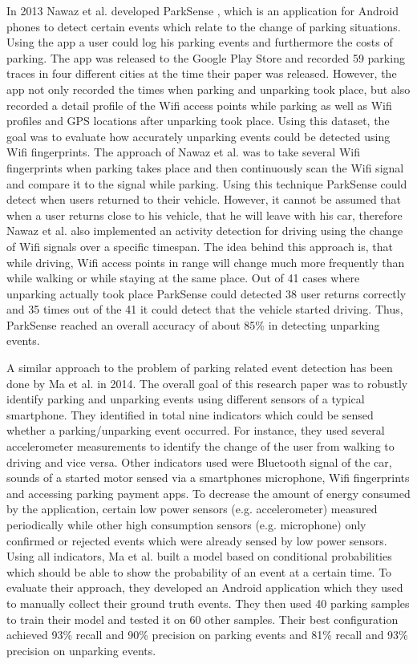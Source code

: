 In 2013 Nawaz et al. developed ParkSense \cite{Nawaz:2013:PSB:2500423.2500438}, which is an application for Android phones to detect certain events which relate to the change of parking situations. Using the app a user could log his parking events and furthermore the costs of parking. The app was released to the Google Play Store and recorded 59 parking traces in four different cities at the time their paper was released. However, the app not only recorded the times when parking and unparking took place, but also recorded a detail profile of the Wifi access points while parking as well as Wifi profiles and GPS locations after unparking took place. Using this dataset, the goal was to evaluate how accurately unparking events could be detected using Wifi fingerprints. The approach of Nawaz et al. was to take several Wifi fingerprints when parking takes place and then continuously scan the Wifi signal and compare it to the signal while parking. Using this technique ParkSense could detect when users returned to their vehicle. However, it cannot be assumed that when a user returns close to his vehicle, that he will leave with his car, therefore Nawaz et al. also implemented an activity detection for driving using the change of Wifi signals over a specific timespan. The idea behind this approach is, that while driving, Wifi access points in range will change much more frequently than while walking or while staying at the same place. Out of 41 cases where unparking actually took place ParkSense could detected 38 user returns correctly and 35 times out of the 41 it could detect that the vehicle started driving. Thus, ParkSense reached an overall accuracy of about 85\% in detecting unparking events.

A similar approach to the problem of parking related event detection has been done by Ma et al. \cite{Ma:2014:USP:2674918.2674929} in 2014. The overall goal of this research paper was to robustly identify parking and unparking events using different sensors of a typical smartphone. They identified in total nine indicators which could be sensed whether a parking/unparking event occurred. For instance, they used several accelerometer measurements to identify the change of the user from walking to driving and vice versa. Other indicators used were Bluetooth signal of the car, sounds of a started motor sensed via a smartphones microphone, Wifi fingerprints and accessing parking payment apps. To decrease the amount of energy consumed by the application, certain low power sensors (e.g. accelerometer) measured periodically while other high consumption sensors (e.g. microphone) only confirmed or rejected events which were already sensed by low power sensors. Using all indicators, Ma et al. built a model based on conditional probabilities which should be able to show the probability of an event at a certain time. To evaluate their approach, they developed an Android application which they used to manually collect their ground truth events. They then used 40 parking samples to train their model and tested it on 60 other samples. Their best configuration achieved 93\% recall and 90\% precision on parking events and 81\% recall and 93\% precision on unparking events.

